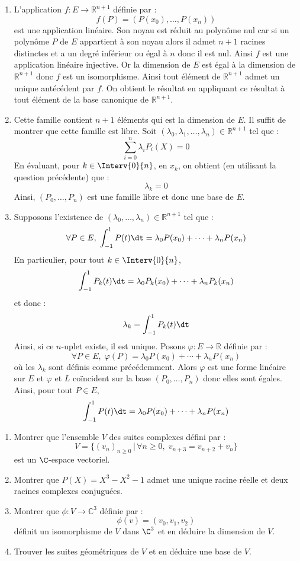 \documentclass[a4paper,10pt]{report}
\begin{document}
\begin{enumerate}
\item L'application $f : E \rightarrow \mathbb{R}^{n+1}$ définie par :
$$ f(P) = (P(x_0), \ldots, P(x_n))$$
est une application linéaire. Son noyau est réduit au polynôme nul car si un polynôme $P$ de $E$ appartient à son noyau alors il admet $n+1$ racines distinctes et a un degré inférieur ou égal à $n$ donc il est nul. Ainsi $f$ est une application linéaire injective. Or la dimension de $E$ est égal à la dimension de $\mathbb{R}^{n+1}$ donc $f$ est un isomorphisme. Ainsi tout élément de $\mathbb{R}^{n+1}$ admet un unique antécédent par $f$. On obtient le résultat en appliquant ce résultat à tout élément de la base canonique de $\mathbb{R}^{n+1}$.
\item Cette famille contient $n+1$ éléments qui est la dimension de $E$. Il suffit de montrer que cette famille est libre. Soit $(\lambda_0, \lambda_1, \ldots, \lambda_n) \in \mathbb{R}^{n+1}$ tel que :
$$ \sum_{i=0}^n \lambda_i P_i (X)= 0$$
En évaluant, pour $k \in \Interv{0}{n}$, en $x_k$, on obtient (en utilisant la question précédente) que :
$$ \lambda_k =0$$
Ainsi, $(P_0, \ldots, P_n)$ est une famille libre et donc une base de $E$.
\item Supposons l'existence de $(\lambda_0, \ldots, \lambda_n) \in \mathbb{R}^{n+1}$ tel que :
$$ \forall P \in E, \; \int_{-1}^1 P(t) \dt = \lambda_0 P(x_0) + \cdots + \lambda_n P(x_n)$$
En particulier, pour tout $k \in \Interv{0}{n}$,
$$ \int_{-1}^1 P_k(t) \dt = \lambda_0 P_k(x_0) + \cdots + \lambda_n P_k(x_n)$$
et donc :
$$ \lambda_k =  \int_{-1}^1 P_k(t) \dt$$
Ainsi, si ce $n$-uplet existe, il est unique. Posons $\varphi : E \rightarrow \mathbb{R}$ définie par :
$$  \forall P \in E, \;  \varphi(P)= \lambda_0 P(x_0) + \cdots + \lambda_n P(x_n)$$
où les $\lambda_k$ sont définis comme précédemment. Alors $\varphi$ est une forme linéaire sur $E$ et $\varphi$ et $L$ coïncident sur la base $(P_0, \ldots, P_n)$ donc elles sont égales. Ainsi, pour tout $P \in E$,
$$ \int_{-1}^1 P(t) \dt = \lambda_0 P(x_0) + \cdots + \lambda_n P(x_n)$$
\end{enumerate}

\begin{Exa} \begin{enumerate}
 \item Montrer que l'ensemble $V$ des suites complexes défini par :
 $$ V = \lbrace (v_n)_{n \geq 0} \, \vert \, \forall n \geq 0, \; v_{n+3}=v_{n+2}+v_n \rbrace$$
est un $\C$-espace vectoriel.
 \item Montrer que $P(X)=X^3-X^2-1$ admet une unique racine réelle et deux racines complexes conjuguées.
 \item Montrer que $\phi : V \rightarrow \mathbb{C}^3$ définie par :
 $$ \phi(v)=(v_0,v_1,v_2)$$
  définit un isomorphisme de $V$ dans $\C^3$ et en déduire la dimension de $V$.
 \item Trouver les suites géométriques de $V$ et en déduire une base de $V$.
\end{enumerate}
\end{Exa}
\end{document}
